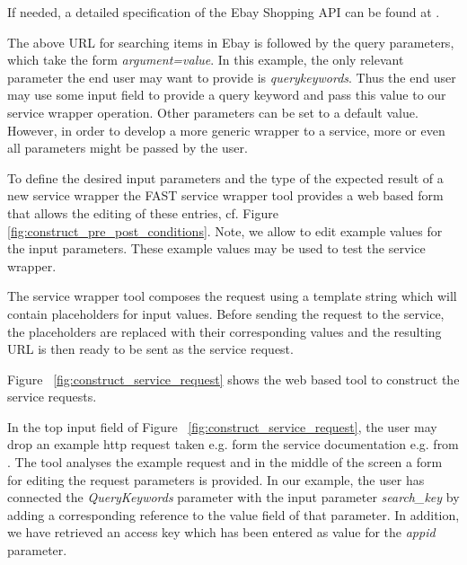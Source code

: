If needed, a detailed specification of the Ebay Shopping API can be found at \cite{eBayShoppingAPIs}.

The above URL for searching items in Ebay is followed by the query parameters, which take the form \textit{argument=value}. In this example, the only relevant parameter the end user may want to provide is \emph{querykeywords}. Thus the end user may use some input field to provide a query keyword and pass this value to our service wrapper operation. Other parameters can be set to a default value. However, in order to develop a more generic wrapper to a service, more or even all parameters might be passed by the user.

To define the desired input parameters and the type of the expected result of a new service wrapper the FAST service wrapper tool provides a web based form that allows the editing of these entries, cf. Figure \ref{fig:construct_pre_post_conditions}. Note, we allow to edit example values for the input parameters. These example values may be used to test the service wrapper. 


The service wrapper tool composes the request using a template string which will contain placeholders for input values. Before sending the request to the service, the placeholders are replaced with their corresponding values and the resulting URL is then ready to be sent as the service request.

Figure ~\ref{fig:construct_service_request} shows the web based tool to construct the service requests.


In the top input field of Figure ~\ref{fig:construct_service_request}, the user may drop an example http request taken e.g. form the service documentation e.g. from \cite{eBayShoppingAPIs}. The tool analyses the example request and in the middle of the screen a form for editing the request parameters is provided. In our example, the user has connected the \textit{QueryKeywords} parameter with the input parameter \textit{search\_key} by adding a corresponding reference to the value field of that parameter. In addition, we have retrieved an access key which has been entered as value for the \textit{appid} parameter.

